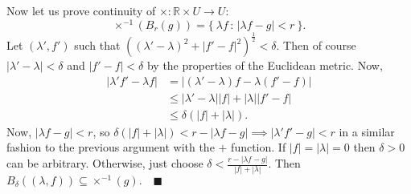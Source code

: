 \documentclass{article}
\begin{document}
Now let us prove continuity of $\times:\mathbb{R}\times U\to U$:
$$\times^{-1}(B_r(g))=\{\ \lambda f\,:\,|\lambda f-g|<r\ \}.$$
Let $(\lambda', f')$ such that $((\lambda'-\lambda)^2+|f'-f|^2)^\frac{1}{2}<\delta$.\newline
Then of course $|\lambda'-\lambda|<\delta$ and $|f'-f|<\delta$ by the properties of the Euclidean metric. Now,
\begin{align*}
	|\lambda'f'-\lambda f| & = |(\lambda'-\lambda)f-\lambda(f'-f)|      \\
	                       & \leq |\lambda'-\lambda||f|+|\lambda||f'-f| \\
	                       & \leq\delta(|f|+|\lambda|).
\end{align*}
Now, $|\lambda f-g|<r$, so $\delta(|f|+|\lambda|)<r-|\lambda f-g|\implies|\lambda'f'-g|<r$ in a similar fashion to the previous argument with the $+$ function.
If $|f|=|\lambda|=0$ then $\delta>0$ can be arbitrary. Otherwise, just choose $\delta<\frac{r-|\lambda f-g|}{|f|+|\lambda|}.$\newline
Then $B_\delta((\lambda,f))\subseteq\times^{-1}(g).\quad\blacksquare$
\end{document}
